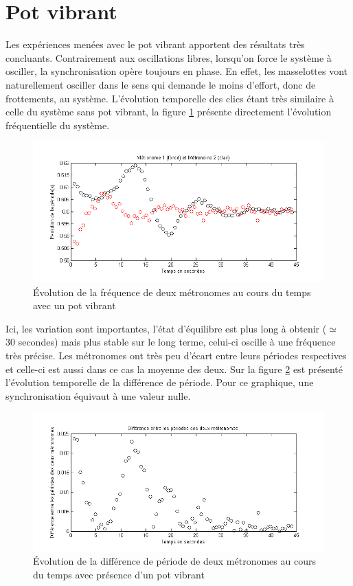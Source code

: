 \documentclass[a4paper,11pt]{report}
\begin{document}
\section{Pot vibrant}
Les expériences menées avec le pot vibrant apportent des résultats très concluants. Contrairement aux oscillations libres, lorsqu'on force le système à osciller, la synchronisation opère toujours en phase. En effet, les masselottes vont naturellement osciller dans le sens qui demande le moins d'effort, donc de frottements, au système. L'évolution temporelle des clics étant très similaire à celle du système sans pot vibrant, la figure \ref{SynchroFP} présente directement l'évolution fréquentielle du système.
\begin{figure}[h]
\centering
\includegraphics[width=1\textwidth]{PotVibrant_Synchro_Frequence_200BPM}
\caption{Évolution de la fréquence de deux métronomes au cours du temps avec un pot vibrant}
\label{SynchroFP}
\end{figure}

Ici, les variation sont importantes, l'état d'équilibre est plus long à obtenir ($\simeq$ 30 secondes) mais plus stable sur le long terme, celui-ci oscille à une fréquence très précise. Les métronomes ont très peu d'écart entre leurs périodes respectives et celle-ci est aussi dans ce cas la moyenne des deux. Sur la figure \ref{SynchroPP} est présenté l'évolution temporelle de la différence de période. Pour ce graphique, une synchronisation équivaut à une valeur nulle.
\begin{figure}[h]
\centering
\includegraphics[width=1\textwidth]{PotVibrant_Synchro_Periode_200BPM}
\caption{Évolution de la différence de période de deux métronomes au cours du temps avec présence d'un pot vibrant}
\label{SynchroPP}
\end{figure}\\
\end{document}
